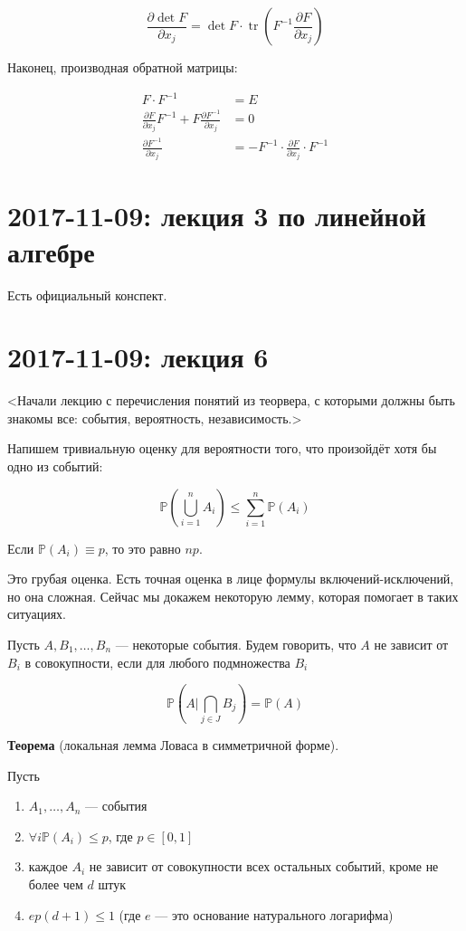 \documentclass[12pt]{article}
\renewcommand{\P}{\mathbb{P}}
\begin{document}
\[
\frac {\partial \det F} {\partial x_j} = \det F \cdot \operatorname{tr} \left( F^{-1} \frac {\partial F} {\partial x_j} \right)
\]

Наконец, производная обратной матрицы:

\begin{align*}
F \cdot F^{-1} &= E \\
\frac {\partial F} {\partial x_j} F^{-1} + F \frac {\partial F^{-1}} {\partial x_j} &= 0 \\
\frac {\partial F^{-1}} {\partial x_j} &= -F^{-1} \cdot \frac {\partial F} {\partial x_j} \cdot F^{-1}
\end{align*}

\section{2017-11-09: лекция 3 по линейной алгебре}

Есть официальный конспект.

\section{2017-11-09: лекция 6}

<Начали лекцию с перечисления понятий из теорвера, с которыми должны быть знакомы все: события, вероятность, независимость.>

Напишем тривиальную оценку для вероятности того, что произойдёт хотя бы одно из событий:

\[
\P \left( \bigcup_{i=1}^n A_i \right) \leq \sum_{i=1}^n \P(A_i)
\]

Если $\P(A_i) \equiv p$, то это равно $np$.

Это грубая оценка. Есть точная оценка в лице формулы включений-исключений, но она сложная. Сейчас мы докажем некоторую лемму, которая помогает в таких ситуациях.

Пусть $A, B_1, \ldots, B_n$ — некоторые события. Будем говорить, что $A$ не зависит от $B_i$ в совокупности, если для любого подмножества $B_i$

\[
\P \left( A | \bigcap_{j \in J} B_j \right) = \P(A)
\]

\textbf{Теорема} (локальная лемма Ловаса в симметричной форме).

Пусть

\begin{enumerate}
\item $A_1, \ldots, A_n$ — события
\item $\forall i \P(A_i) \leq p$, где $p \in [0, 1]$
\item каждое $A_i$ не зависит от совокупности всех остальных событий, кроме не более чем $d$ штук
\item $ep(d+1) \leq 1$ (где $e$ — это основание натурального логарифма)
\end{enumerate}
\end{document}
